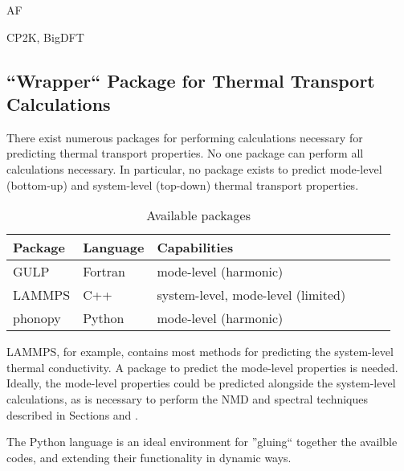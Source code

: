 AF

CP2K, BigDFT

\subsection{``Wrapper`` Package for Thermal Transport Calculations}

There exist numerous packages for performing calculations necessary for 
predicting thermal transport properties. No one package can perform all 
calculations necessary. In particular, no package exists to predict 
mode-level (bottom-up) and system-level (top-down) thermal transport 
properties.   

\begin{center}
\begingroup
\begin{table}
\caption{\label{T:available_codes}
Available packages
}
\begin{tabular}{llllll}
\hline
Package & Language & Capabilities \\
\hline
GULP & Fortran & mode-level (harmonic) \\
LAMMPS & C++ & system-level, mode-level (limited) \\
phonopy & Python & mode-level (harmonic) \\
\end{tabular}
\end{table}
\endgroup
\end{center}

LAMMPS, for example, contains most methods for predicting the 
system-level thermal conductivity. A package to predict the 
mode-level properties is needed.  Ideally, the mode-level properties 
could be predicted alongside the system-level calculations, as is 
necessary to perform the NMD and spectral techniques described in 
Sections and . 

The Python language is an ideal environment for ''gluing`` together 
the availble codes, and extending their functionality in dynamic ways. 






